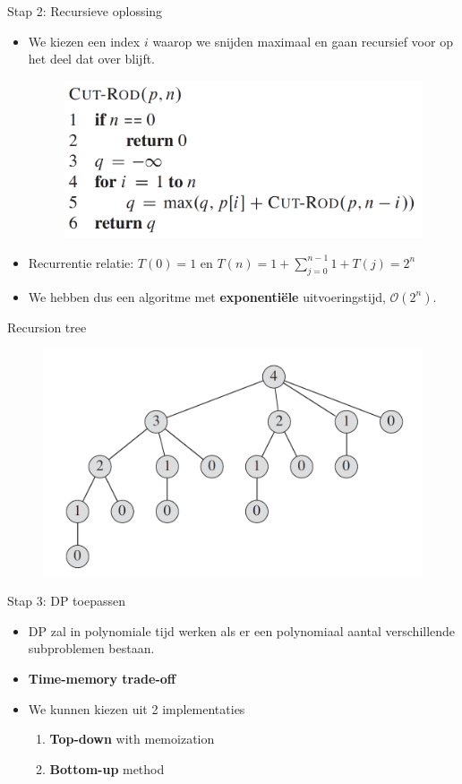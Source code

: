 \documentclass
   [kulak] %
   {kulakbeamer}
\begin{document}
\begin{frame}{Stap 2: Recursieve oplossing}
    \begin{itemize}
        \item<1-> We kiezen een index $i$ waarop we snijden maximaal en gaan recursief voor op het deel dat over blijft.
        \begin{figure}
            \centering
            \includegraphics[width=0.6\linewidth]{naiverodcut.png}
        \end{figure}
        \item<2-> Recurrentie relatie: $T(0) = 1 \text{ en } T(n) = 1 +  \sum_{j=0}^{n-1} 1 + T(j) = 2^n$
        \item<3-> We hebben dus een algoritme met \textbf{exponentiële} uitvoeringstijd, $\mathcal{O}(2^n)$.
    \end{itemize}
\end{frame}

\begin{frame}{Recursion tree}
    \begin{figure}
        \centering
        \includegraphics[width=0.7\linewidth]{recursion-tree.png}
    \end{figure}
\end{frame}

\begin{frame}{Stap 3: DP toepassen}
    \begin{itemize}
        \item<1-> DP zal in polynomiale tijd werken als er een polynomiaal aantal verschillende subproblemen bestaan.
        \item<2-> \textbf{Time-memory trade-off}
        \item<3-> We kunnen kiezen uit 2 implementaties 
        \begin{enumerate}
            \item \textbf{Top-down} with memoization
            \item \textbf{Bottom-up} method
        \end{enumerate}
    \end{itemize}
\end{frame}
\end{document}
